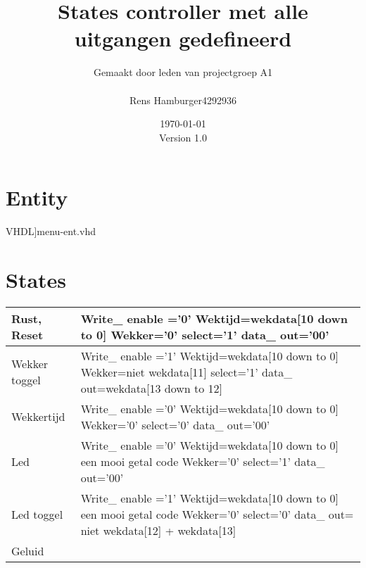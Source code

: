 \documentclass[a4paper, oneside, 10pt]{article}
\title{\textbf{States controller met alle uitgangen gedefineerd}}
\author{
Gemaakt door leden van projectgroep A1\\
\begin{tabular}{c | l}
Rens Hamburger & 4292936 \\
\end{tabular}
}
\date{\today\\ Version 1.0}
\begin{document}
\maketitle

\newpage
\section{Entity}
\scriptsize 
  VHDL]{menu-ent.vhd}
 \normalsize

\section{States}
\begin{longtable}{|l| p{10cm} |}
\hline
Rust, Reset &
Write\_ enable ='0' \newline
Wektijd=wekdata[10 down to 0] \newline
Wekker='0' \newline
select='1' \newline
data\_ out='00' \\ \hline
Wekker toggel &
Write\_ enable ='1' \newline
Wektijd=wekdata[10 down to 0] \newline
Wekker=niet wekdata[11] \newline
select='1' \newline
data\_ out=wekdata[13 down to 12] \\ \hline
Wekkertijd &
Write\_ enable ='0' \newline
Wektijd=wekdata[10 down to 0] \newline
Wekker='0' \newline
select='0' \newline
data\_ out='00' \\ \hline
Led &
Write\_ enable ='0' \newline
Wektijd=wekdata[10 down to 0] een mooi getal code \newline
Wekker='0' \newline
select='1' \newline
data\_ out='00' \\ \hline
Led toggel &
Write\_ enable ='1' \newline
Wektijd=wekdata[10 down to 0] een mooi getal code \newline
Wekker='0' \newline
select='0' \newline
data\_ out= niet wekdata[12] + wekdata[13] \\ \hline
Geluid & 

\end{longtable}
\end{document}
